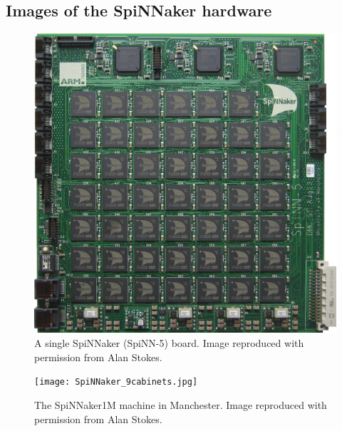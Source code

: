 \documentclass[]{article}
\begin{document}



\begin{appendices}
\section{Images of the SpiNNaker hardware}
\label{sec:spinn_photos}

\begin{figure}[H]
  \includegraphics[width=\linewidth]{spinnakerBoard.jpg}
  \caption{A single SpiNNaker (SpiNN-5) board.
  Image reproduced with permission from Alan Stokes.}
\end{figure}

\begin{figure}[H]
  \texttt{[image: SpiNNaker\_9cabinets.jpg]}
  \caption{The SpiNNaker1M machine in Manchester.
  Image reproduced with permission from Alan Stokes.}
\end{figure}

\end{appendices}
\end{document}
